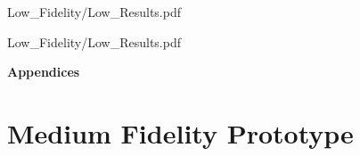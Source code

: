 \documentclass[a4 paper, 12pt]{article}
\begin{document}
        \pagebreak
        
                    {Low_Fidelity/Low_Results.pdf}
                    \label{sec:A.4}
    
                    {Low_Fidelity/Low_Results.pdf}

    \pagebreak
    
    \label{sec:A.5}


\pagebreak
\begin{center}
    \Huge \textbf{Appendices}
    \section{Medium Fidelity Prototype}
\end{center}

    \pagebreak    
    
                \label{sec:B.1}
    \pagebreak 
    
                \label{sec:B.2} 
    
\end{document}
